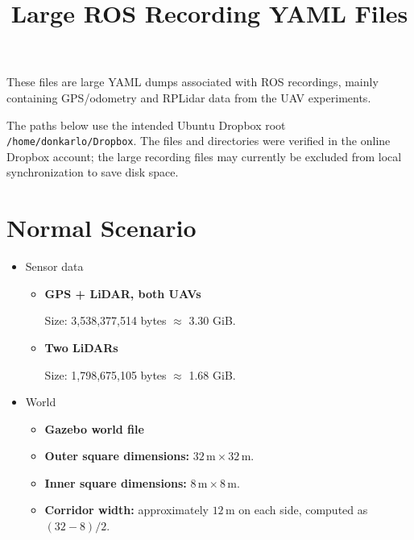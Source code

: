 \documentclass[a4paper]{article}
\title{Large ROS Recording YAML Files}
\date{}
\begin{document}
   \maketitle

   These files are large YAML dumps associated with ROS recordings, mainly containing GPS/odometry and RPLidar data from the UAV experiments.

   The paths below use the intended Ubuntu Dropbox root \texttt{/home/donkarlo/Dropbox}. The files and directories were verified in the online Dropbox account; the large recording files may currently be excluded from local synchronization to save disk space.

   \section{Normal Scenario}

      \begin{itemize}
         \item Sensor data
         \begin{itemize}
            \item \textbf{GPS + LiDAR, both UAVs}

            \texttt{}

            Size: 3,538,377,514 bytes $\approx$ 3.30 GiB.

            \item \textbf{Two LiDARs}

            \texttt{}

            Size: 1,798,675,105 bytes $\approx$ 1.68 GiB.
         \end{itemize}
         \item World
         \begin{itemize}
            \item \textbf{Gazebo world file}

            \texttt{}

            \item \textbf{Outer square dimensions:} $32\,\mathrm{m} \times 32\,\mathrm{m}$.
            \item \textbf{Inner square dimensions:} $8\,\mathrm{m} \times 8\,\mathrm{m}$.
            \item \textbf{Corridor width:} approximately $12\,\mathrm{m}$ on each side, computed as $(32-8)/2$.
         \end{itemize}


      \end{itemize}
\end{document}

